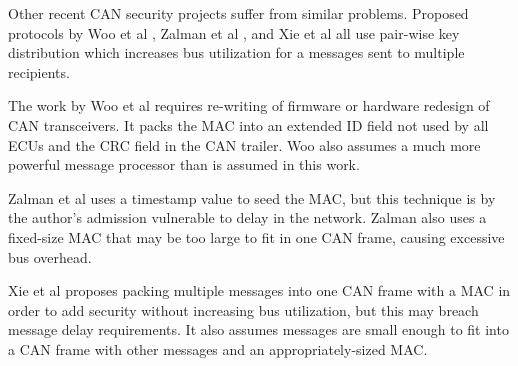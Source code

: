 Other recent CAN security projects suffer from similar problems. Proposed protocols by Woo et al \cite{Woo-14}, Zalman et al \cite{Zalman-14}, and Xie et al \cite{Xie-15} all use pair-wise key distribution which increases bus utilization for a messages sent to multiple recipients.

The work by Woo et al requires re-writing of firmware or hardware redesign of CAN transceivers. It packs the MAC into an extended ID field not used by all ECUs and the CRC field in the CAN trailer. Woo also assumes a much more powerful message processor than is assumed in this work.

Zalman et al uses a timestamp value to seed the MAC, but this technique is by the author's admission vulnerable to delay in the network. Zalman also uses a fixed-size MAC that may be too large to fit in one CAN frame, causing excessive bus overhead.

Xie et al proposes packing multiple messages into one CAN frame with a MAC in order to add security without increasing bus utilization, but this may breach message delay requirements. It also assumes messages are small enough to fit into a CAN frame with other messages and an appropriately-sized MAC.